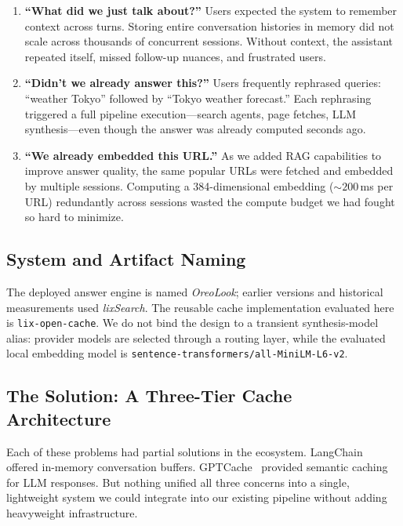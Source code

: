\documentclass[conference]{IEEEtran}
\begin{document}
\begin{enumerate}
\item \textbf{``What did we just talk about?''} Users expected the system to remember context across turns. Storing entire conversation histories in memory did not scale across thousands of concurrent sessions. Without context, the assistant repeated itself, missed follow-up nuances, and frustrated users.

\item \textbf{``Didn't we already answer this?''} Users frequently rephrased queries: ``weather Tokyo'' followed by ``Tokyo weather forecast.'' Each rephrasing triggered a full pipeline execution---search agents, page fetches, LLM synthesis---even though the answer was already computed seconds ago.

\item \textbf{``We already embedded this URL.''} As we added RAG capabilities to improve answer quality, the same popular URLs were fetched and embedded by multiple sessions. Computing a 384-dimensional embedding (${\sim}200$\,ms per URL) redundantly across sessions wasted the compute budget we had fought so hard to minimize.
\end{enumerate}

\subsection{System and Artifact Naming}

The deployed answer engine is named \emph{OreoLook}; earlier versions and historical measurements used \emph{lixSearch}. The reusable cache implementation evaluated here is \texttt{lix-open-cache}. We do not bind the design to a transient synthesis-model alias: provider models are selected through a routing layer, while the evaluated local embedding model is \texttt{sentence-transformers/all-MiniLM-L6-v2}.

\subsection{The Solution: A Three-Tier Cache Architecture}

Each of these problems had partial solutions in the ecosystem. LangChain~\cite{langchain2023} offered in-memory conversation buffers. GPTCache~\cite{gptcache2023} provided semantic caching for LLM responses. But nothing unified all three concerns into a single, lightweight system we could integrate into our existing pipeline without adding heavyweight infrastructure.
\end{document}
